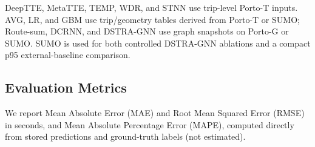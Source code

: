 DeepTTE, MetaTTE, TEMP, WDR, and STNN use trip-level Porto-T inputs. AVG, LR, and GBM use trip/geometry tables derived from Porto-T or SUMO; Route-sum, DCRNN, and DSTRA-GNN use graph snapshots on Porto-G or SUMO. SUMO is used for both controlled DSTRA-GNN ablations and a compact p95 external-baseline comparison.

\subsection{Evaluation Metrics}
We report Mean Absolute Error (MAE) and Root Mean Squared Error (RMSE) in seconds, and Mean Absolute Percentage Error (MAPE), computed directly from stored predictions and ground-truth labels (not estimated).
